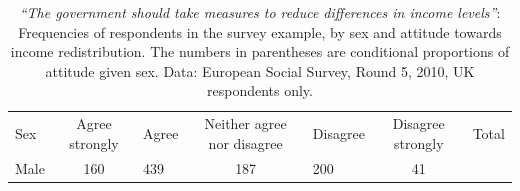 \documentclass[11pt,a4paper,openany]{book}
\begin{document}
\begin{longtable}[]{@{}lclclcl@{}}
\caption{\label{tab:t-sex-attitude-ch4} \emph{``The government should take
measures to reduce differences in income levels''}: Frequencies of
respondents in the survey example, by sex and attitude towards income
redistribution. The numbers in parentheses are conditional proportions
of attitude given sex. Data: European Social Survey, Round 5, 2010, UK
respondents only.}\tabularnewline
\toprule
\begin{minipage}[t]{0.29\columnwidth}\raggedright\strut
Sex\strut
\end{minipage} & \begin{minipage}[t]{0.29\columnwidth}\centering\strut
Agree strongly\strut
\end{minipage} & \begin{minipage}[t]{0.04\columnwidth}\raggedright\strut
Agree\strut
\end{minipage} & \begin{minipage}[t]{0.06\columnwidth}\centering\strut
Neither agree nor disagree\strut
\end{minipage} & \begin{minipage}[t]{0.04\columnwidth}\raggedright\strut
Disagree\strut
\end{minipage} & \begin{minipage}[t]{0.04\columnwidth}\centering\strut
Disagree strongly\strut
\end{minipage} & \begin{minipage}[t]{0.03\columnwidth}\raggedright\strut
Total\strut
\end{minipage}\tabularnewline
\begin{minipage}[t]{0.29\columnwidth}\raggedright\strut
Male\strut
\end{minipage} & \begin{minipage}[t]{0.29\columnwidth}\centering\strut
160\strut
\end{minipage} & \begin{minipage}[t]{0.04\columnwidth}\raggedright\strut
439\strut
\end{minipage} & \begin{minipage}[t]{0.06\columnwidth}\centering\strut
187\strut
\end{minipage} & \begin{minipage}[t]{0.04\columnwidth}\raggedright\strut
200\strut
\end{minipage} & \begin{minipage}[t]{0.04\columnwidth}\centering\strut
41\strut
\end{minipage} & \begin{minipage}[t]{0.03\columnwidth}\raggedright\strut

\end{minipage}
\end{longtable}
\end{document}
